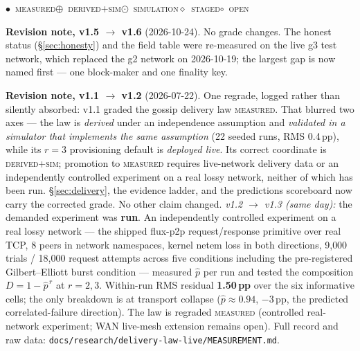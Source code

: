 \documentclass[10pt,a4paper]{article}
\newcommand{\stM}{\textcolor{sigilcyan}{$\bullet$}~{\scriptsize\textcolor{sigilcyan}{\textsc{measured}}}}
\newcommand{\stS}{\textcolor{sigilblue}{$\odot$}~{\scriptsize\textcolor{sigilblue}{\textsc{simulation}}}}
\newcommand{\stD}{\textcolor{sigilblue}{$\oplus$}~{\scriptsize\textcolor{sigilblue}{\textsc{derived+sim}}}}
\newcommand{\stG}{\textcolor{sigilviolet}{$\diamond$}~{\scriptsize\textcolor{sigilviolet}{\textsc{staged}}}}
\newcommand{\stO}{\textcolor{sigilamber}{$\circ$}~{\scriptsize\textcolor{sigilamber}{\textsc{open}}}}
\newcommand{\stC}{{\scriptsize\textcolor{gray}{$\triangle$~\textit{conjectural}}}}
\begin{document}
\vspace{4pt}

\begin{center}
\small
\stM\quad\stD\quad\stS\quad\stG\quad\stO\quad\stC
\end{center}

\vspace{4pt}
\begin{tcolorbox}[colback=panelbg,colframe=slate,boxrule=0.6pt,arc=2pt,
                  left=8pt,right=8pt,top=6pt,bottom=6pt]
\small\textbf{Revision note, v1.5 $\to$ v1.6} (2026-10-24). No grade changes. The honest status
(\S\ref{sec:honesty}) and the field table were re-measured on the live g3 test network, which replaced the g2
network on 2026-10-19; the largest gap is now named first --- one block-maker and one finality key.
\par\medskip
\small\textbf{Revision note, v1.1 $\to$ v1.2} (2026-07-22). One regrade, logged
rather than silently absorbed: v1.1 graded the gossip delivery law
\textsc{measured}. That blurred two axes — the law is \emph{derived} under an
independence assumption and \emph{validated in a simulator that implements the same
assumption} (22 seeded runs, RMS 0.4\,pp), while its $r{=}3$ provisioning default is
\emph{deployed live}. Its correct coordinate is \textsc{derived+sim}; promotion to
\textsc{measured} requires live-network delivery data or an independently controlled
experiment on a real lossy network, neither of which has been run. \S\ref{sec:delivery},
the evidence ladder, and the predictions scoreboard now carry the corrected grade. No
other claim changed. \emph{v1.2 $\to$ v1.3 (same day):} the demanded experiment was
\textbf{run}. An independently controlled experiment on a real lossy network — the
shipped flux-p2p request/response primitive over real TCP, 8 peers in network
namespaces, kernel netem loss in both directions, 9{,}000 trials / 18{,}000 request
attempts across five conditions including the pre-registered Gilbert--Elliott burst
condition — measured $\hat p$ per run and tested the composition $D=1-\hat p^{\,r}$ at
$r{=}2,3$. Within-run RMS residual \textbf{1.50\,pp} over the six informative cells;
the only breakdown is at transport collapse ($\hat p\approx0.94$, $-3$\,pp, the
predicted correlated-failure direction). The law is regraded \textsc{measured}
(controlled real-network experiment; WAN live-mesh extension remains open). Full
record and raw data: \texttt{docs/research/delivery-law-live/MEASUREMENT.md}.
\end{tcolorbox}
\end{document}
